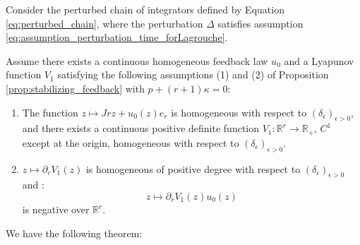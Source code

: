 

Consider the perturbed chain of integrators defined by Equation \ref{eq:perturbed_chain}, where the 
perturbation \(\Delta\) satisfies assumption \ref{eq:assumption_perturbation_time_forLagrouche}.

Assume there exists a continuous homogeneous feedback law \(u_0\) and a Lyapunov 
function \(V_1\) satisfying the following assumptions (1) and (2) of Proposition 
\ref{prop:stabilizing_feedback} with \(p+(r+1)\kappa=0\):

\begin{enumerate}
    \item The function \( z \mapsto Jr z + u_0(z) e_r \) is homogeneous with respect 
    to \((\delta_\epsilon)_{\epsilon > 0}\), and there exists a continuous positive definite 
    function \( V_1: \mathbb{R}^r \to \mathbb{R}_+ \), \( C^1 \) except at the origin, homogeneous 
    with respect to \((\delta_\epsilon)_{\epsilon > 0}\).

    \item \( z \mapsto \partial_r V_1(z) \) is homogeneous of positive degree with respect 
    to \((\delta_\epsilon)_{\epsilon > 0}\) and : \begin{equation} z \mapsto \partial_r V_1(z)u_0(z) \end{equation} is negative 
    over \(\mathbb{R}^r\).
\end{enumerate}

We have the following theorem:

